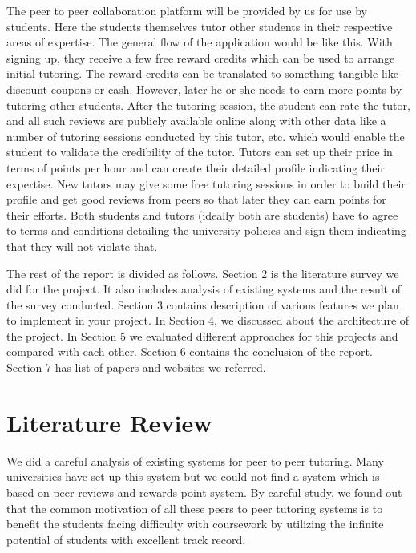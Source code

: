 \documentclass{sig-alternate-05-2015}
\begin{document}
The peer to peer collaboration platform will be provided by us for use by students. Here the students themselves tutor other students in their respective areas of expertise. The general flow of the application would be like this. With signing up, they receive a few free reward credits which can be used to arrange initial tutoring. The reward credits can be translated to something tangible like discount coupons or cash. However, later he or she needs to earn more points by tutoring other students. After the tutoring session, the student can rate the tutor, and all such reviews are publicly available online along with other data like a number of tutoring sessions conducted by this tutor, etc. which would enable the student to validate the credibility of the tutor. Tutors can set up their price in terms of points per hour and can create their detailed profile indicating their expertise. New tutors may give some free tutoring sessions in order to build their profile and get good reviews from peers so that later they can earn points for their efforts. Both students and tutors (ideally both are students) have to agree to terms and conditions detailing the university policies and sign them indicating that they will not violate that\cite{Todd:Experiment}. 

The rest of the report is divided as follows. Section 2 is the literature survey we did for the project. It also includes analysis of existing systems and the result of the survey conducted. Section 3 contains description of various features we plan to implement in your project. In Section 4, we discussed about the architecture of the project. In Section 5 we evaluated different approaches for this projects and compared with each other. Section 6 contains the conclusion of the report. Section 7 has list of papers and websites we referred. 


\section{Literature Review}
We did a careful analysis of existing systems for peer to peer tutoring. Many universities have set up this system but we could not find a system which is based on peer reviews and rewards point system. By careful study, we found out that the common motivation of all these peers to peer tutoring systems is to benefit the students facing difficulty with coursework by utilizing the infinite potential of students with excellent track record\cite{Topping:effectiveness}.
\end{document}
